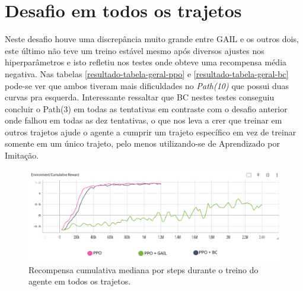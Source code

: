 \section{Desafio em todos os trajetos}
Neste desafio houve uma discrepância muito grande entre GAIL e os outros dois, este último não teve um treino estável mesmo após diversos ajustes nos hiperparâmetros e isto refletiu nos testes onde obteve uma recompensa média negativa. Nas tabelas \ref{resultado-tabela-geral-ppo} e \ref{resultado-tabela-geral-bc} pode-se ver que ambos tiveram mais dificuldades no \textit{Path(10)} que possui duas curvas pra esquerda. Interessante ressaltar que BC nestes testes conseguiu concluir o Path(3) em todas as tentativas em contraste com o desafio anterior onde falhou em todas as dez tentativas, o que nos leva a crer que treinar em outros trajetos ajude o agente a cumprir um trajeto específico em vez de treinar somente em um único trajeto, pelo menos utilizando-se de Aprendizado por Imitação.

\begin{figure}[h]
    \centering
    \includegraphics[scale=0.35]{figs/treinos/desafio-geral/recompensa-ppo-gail-bc.png}
    \caption{Recompensa cumulativa mediana por steps durante o treino do agente em todos os trajetos.}
\end{figure}

